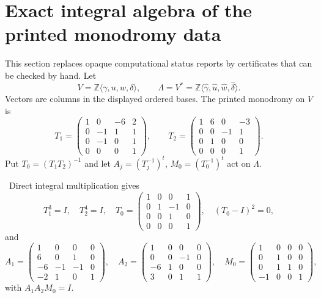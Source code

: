 \section{Exact integral algebra of the printed monodromy data}

This section replaces opaque computational status reports by certificates
that can be checked by hand.  Let
\[
 V=\mathbb Z\langle\gamma,u,w,\delta\rangle,\qquad
 \Lambda=V^*
 =\mathbb Z\langle\widehat\gamma,\widehat u,
                         \widehat w,\widehat\delta\rangle .
\]
Vectors are columns in the displayed ordered bases.  The printed monodromy on
$V$ is
\[
T_1=
\begin{pmatrix}
1&0&-6&2\\0&-1&1&1\\0&-1&0&1\\0&0&0&1
\end{pmatrix},
\qquad
T_2=
\begin{pmatrix}
1&6&0&-3\\0&0&-1&1\\0&1&0&0\\0&0&0&1
\end{pmatrix}.
\tag{3.1}
\]
Put $T_0=(T_1T_2)^{-1}$ and let
$A_j=(T_j^{-1})^t$, $M_0=(T_0^{-1})^t$ act on $\Lambda$.

\begin{proposition}\label{prop:monodromy-certificate}
\Verified\ Direct integral multiplication gives
\[
T_1^3=I,\quad T_2^4=I,\quad
T_0=
\begin{pmatrix}
1&0&0&1\\0&1&-1&0\\0&0&1&0\\0&0&0&1
\end{pmatrix},
\quad (T_0-I)^2=0,
\]
and
\[
A_1=
\begin{pmatrix}
1&0&0&0\\6&0&1&0\\-6&-1&-1&0\\-2&1&0&1
\end{pmatrix},
\quad
A_2=
\begin{pmatrix}
1&0&0&0\\0&0&-1&0\\-6&1&0&0\\3&0&1&1
\end{pmatrix},
\quad
M_0=
\begin{pmatrix}
1&0&0&0\\0&1&0&0\\0&1&1&0\\-1&0&0&1
\end{pmatrix},
\]
with $A_1A_2M_0=I$.
\end{proposition}

